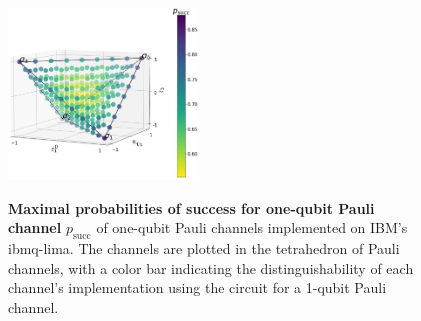 \documentclass[10pt,letterpaper]{article} %
\renewcommand{\succ}{\textrm{succ}}
\begin{document}

\begin{figure}[h!]
\centering
\includegraphics[width=0.45\textwidth]{probabilities-points.png}\\
\caption{{\bf Maximal probabilities of success for one-qubit Pauli channel}
$p_{\succ}$ of one-qubit Pauli channels implemented on IBM's ibmq-lima. The
channels are plotted in the tetrahedron of Pauli channels, with a color bar
indicating the distinguishability of each channel's implementation using the
circuit for a 1-qubit Pauli channel. }
\label{fig: fidelity one qubit}
\end{figure}

\newpage
{}
\end{document}
